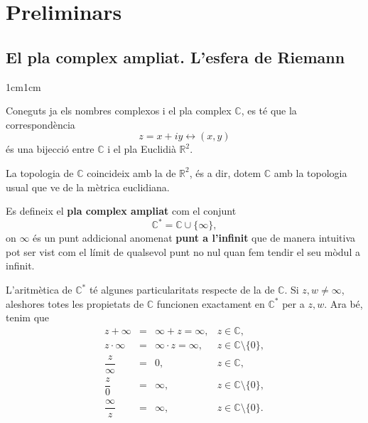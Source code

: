 \section{Preliminars}

\subsection{El pla complex ampliat. L'esfera de Riemann}

\begin{adjustwidth}{1cm}{1cm}

Coneguts ja els nombres complexos i el pla complex $\mathbb{C}$, es té que la correspondència 
$$z=x+iy \longleftrightarrow (x,y)$$
és una bijecció entre $\mathbb{C}$ i el pla Euclidià $\mathbb{R}^2$.

La topologia de $\mathbb{C}$ coincideix amb la de $\mathbb{R}^2$, és a dir, dotem $\mathbb{C}$ amb la topologia usual que ve de la mètrica euclidiana.
    
\begin{definicio}

    Es defineix el \textbf{pla complex ampliat} com el conjunt
    \[
        \mathbb{C}^* = \mathbb{C} \cup \{\infty\},
    \]
    on $\infty$ és un punt addicional anomenat \textbf{punt a l'infinit} que de manera intuitiva pot ser vist com el límit de qualsevol punt no nul quan fem tendir el seu mòdul a infinit.
    \label{pla_complex_ampliat}
\end{definicio}

L'aritmètica de $\mathbb{C}^*$ té algunes particularitats respecte de la de $\mathbb{C}$. Si $z,w\neq \infty$, aleshores totes les propietats de $\mathbb{C}$ funcionen exactament en $\mathbb{C}^*$ per a $z,w$. Ara bé, tenim que
\[
\begin{array}{rcll}
z+\infty &=& \infty+z=\infty,
& z\in\mathbb C, \\[4pt]

z\cdot\infty &=& \infty\cdot z=\infty,
& z\in\mathbb C\setminus\{0\}, \\[4pt]

\dfrac{z}{\infty} &=& 0,
& z\in\mathbb C, \\[8pt]

\dfrac{z}{0} &=& \infty,
& z\in\mathbb C\setminus\{0\}, \\[8pt]

\dfrac{\infty}{z} &=& \infty,
& z\in\mathbb C\setminus\{0\}.
\end{array}
\]


\end{adjustwidth}
